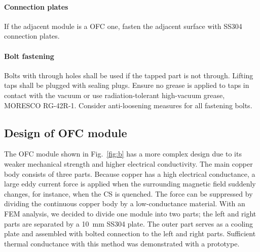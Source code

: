 \documentclass[12pt,a4paper]{article}
\begin{document}
\paragraph{Connection plates}
If the adjacent module is a OFC one, fasten the adjacent surface with SS304 connection plates.

\paragraph{Bolt fastening}
Bolts with through holes shall be used if the tapped part is not through. Lifting taps shall be plugged with sealing plugs. Ensure no grease is applied to taps in contact with the vacuum or use radiation-tolerant high-vacuum grease, MORESCO RG-42R-1. Consider anti-loosening measures for all fastening bolts.

\subsection{Design of OFC module}
The OFC module shown in Fig.~\ref{fig:b} has a more complex design due to its weaker mechanical strength and higher electrical conductivity.  %
The main copper body consists of three parts. 
Because copper has a high electrical conductance, a large eddy current force is applied when the surrounding magnetic field suddenly changes, for instance, when the CS is quenched. The force can be suppressed by dividing the continuous copper body by a low-conductance material. With an FEM analysis, we decided to divide one module into two parts;
the left and right parts are separated by a \SI{10}{\mm} SS304 plate.
The outer part serves as a cooling plate and assembled with bolted connection to the left and right parts. 
Sufficient thermal conductance with this method was demonstrated with a prototype.

\end{document}
